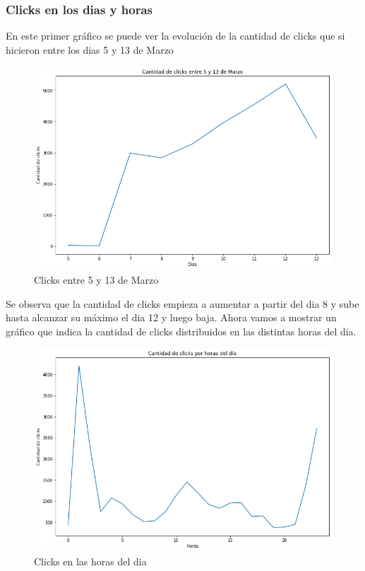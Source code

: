\documentclass[a4paper, 12pt]{article}
\newcommand\tab[1][1cm]{\hspace*{#1}}
\begin{document}
	\subsubsection{Clicks en los dias y horas}
		En este primer gráfico se puede ver la evolución de la cantidad de clicks que si hicieron entre los dias 5 y 13 de Marzo

		\FloatBarrier
		\begin{figure}[h]
			\centering
			\includegraphics[width=\textwidth]{images/clicks/clicks_days.png}
			\caption{Clicks entre 5 y 13 de Marzo}
		\end{figure}
		\FloatBarrier

		\tab Se observa que la cantidad de clicks empieza a aumentar a partir del dia 8 y sube hasta alcanzar su máximo el dia 12 y luego baja.
		\clearpage
		\tab Ahora vamos a mostrar un gráfico que indica la cantidad de clicks distribuidos en las distintas horas del dia.

		\FloatBarrier
		\begin{figure}[h]
			\centering
			\includegraphics[width=\textwidth]{images/clicks/clicks_hours.png}
			\caption{Clicks en las horas del dia}
		\end{figure}
		\FloatBarrier
		
\end{document}
